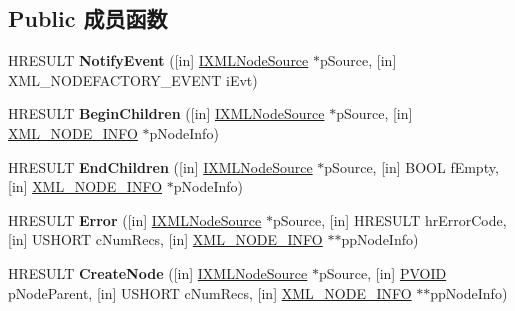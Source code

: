 \subsection*{Public 成员函数}
\begin{DoxyCompactItemize}
\item 
\mbox{\label{interface_x_m_l_p_s_r_1_1_i_x_m_l_node_factory_ade1269305211ea3d177928b62ebc7022}} 
H\+R\+E\+S\+U\+LT {\bfseries Notify\+Event} (\mbox{[}in\mbox{]} \hyperlink{interface_x_m_l_p_s_r_1_1_i_x_m_l_node_source}{I\+X\+M\+L\+Node\+Source} $\ast$p\+Source, \mbox{[}in\mbox{]} X\+M\+L\+\_\+\+N\+O\+D\+E\+F\+A\+C\+T\+O\+R\+Y\+\_\+\+E\+V\+E\+NT i\+Evt)
\item 
\mbox{\label{interface_x_m_l_p_s_r_1_1_i_x_m_l_node_factory_a627c4aea206226b6ef2d8010dcaa492c}} 
H\+R\+E\+S\+U\+LT {\bfseries Begin\+Children} (\mbox{[}in\mbox{]} \hyperlink{interface_x_m_l_p_s_r_1_1_i_x_m_l_node_source}{I\+X\+M\+L\+Node\+Source} $\ast$p\+Source, \mbox{[}in\mbox{]} \hyperlink{struct___x_m_l___n_o_d_e___i_n_f_o}{X\+M\+L\+\_\+\+N\+O\+D\+E\+\_\+\+I\+N\+FO} $\ast$p\+Node\+Info)
\item 
\mbox{\label{interface_x_m_l_p_s_r_1_1_i_x_m_l_node_factory_a6383ea135101f353edeafcfc347c5834}} 
H\+R\+E\+S\+U\+LT {\bfseries End\+Children} (\mbox{[}in\mbox{]} \hyperlink{interface_x_m_l_p_s_r_1_1_i_x_m_l_node_source}{I\+X\+M\+L\+Node\+Source} $\ast$p\+Source, \mbox{[}in\mbox{]} B\+O\+OL f\+Empty, \mbox{[}in\mbox{]} \hyperlink{struct___x_m_l___n_o_d_e___i_n_f_o}{X\+M\+L\+\_\+\+N\+O\+D\+E\+\_\+\+I\+N\+FO} $\ast$p\+Node\+Info)
\item 
\mbox{\label{interface_x_m_l_p_s_r_1_1_i_x_m_l_node_factory_a72910f73108b7e1aeaee6a7abf3814fe}} 
H\+R\+E\+S\+U\+LT {\bfseries Error} (\mbox{[}in\mbox{]} \hyperlink{interface_x_m_l_p_s_r_1_1_i_x_m_l_node_source}{I\+X\+M\+L\+Node\+Source} $\ast$p\+Source, \mbox{[}in\mbox{]} H\+R\+E\+S\+U\+LT hr\+Error\+Code, \mbox{[}in\mbox{]} U\+S\+H\+O\+RT c\+Num\+Recs, \mbox{[}in\mbox{]} \hyperlink{struct___x_m_l___n_o_d_e___i_n_f_o}{X\+M\+L\+\_\+\+N\+O\+D\+E\+\_\+\+I\+N\+FO} $\ast$$\ast$pp\+Node\+Info)
\item 
\mbox{\label{interface_x_m_l_p_s_r_1_1_i_x_m_l_node_factory_a65286e467f9b0b2624c334105869c04c}} 
H\+R\+E\+S\+U\+LT {\bfseries Create\+Node} (\mbox{[}in\mbox{]} \hyperlink{interface_x_m_l_p_s_r_1_1_i_x_m_l_node_source}{I\+X\+M\+L\+Node\+Source} $\ast$p\+Source, \mbox{[}in\mbox{]} \hyperlink{interfacevoid}{P\+V\+O\+ID} p\+Node\+Parent, \mbox{[}in\mbox{]} U\+S\+H\+O\+RT c\+Num\+Recs, \mbox{[}in\mbox{]} \hyperlink{struct___x_m_l___n_o_d_e___i_n_f_o}{X\+M\+L\+\_\+\+N\+O\+D\+E\+\_\+\+I\+N\+FO} $\ast$$\ast$pp\+Node\+Info)
\end{DoxyCompactItemize}
